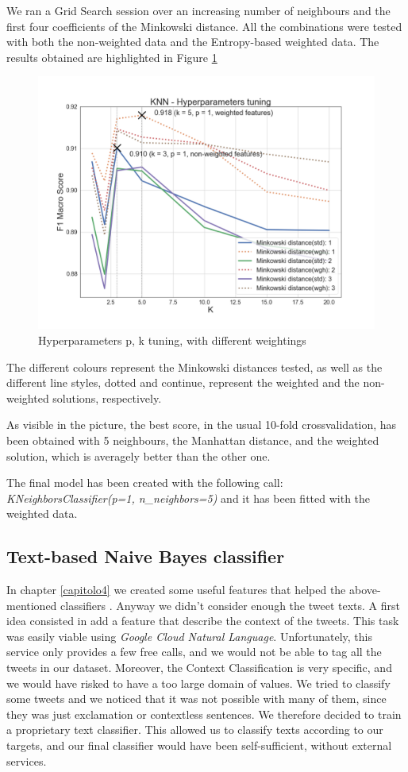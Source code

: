We ran a Grid Search session over an increasing number of neighbours and the first four coefficients of the Minkowski distance.
All the combinations were tested with both the non-weighted data and the Entropy-based weighted data.
The results obtained are highlighted in Figure \ref{fig:knn_tuning}

\begin{figure}
	\includegraphics[width=\columnwidth]{chapter5/figure/knn_tuning.png}
	\caption{Hyperparameters p, k tuning, with different weightings}
	\label{fig:knn_tuning}
\end{figure}
The different colours represent the Minkowski distances tested, as well as the different line styles, dotted and continue, represent the weighted and the non-weighted solutions, respectively.

As visible in the picture, the best score, in the usual 10-fold crossvalidation, has been obtained with 5 neighbours, the Manhattan distance, and the weighted solution, which is averagely better than the other one.

The final model has been created with the following call: \textit{KNeighborsClassifier(p=1, n\_neighbors=5)} and it has been fitted with the weighted data.

\subsection{Text-based Naive Bayes classifier}
In chapter \ref{capitolo4} we created some useful features that helped the above-mentioned classifiers . Anyway we didn't consider enough the tweet texts. A first idea consisted in add a feature that describe the context of the tweets. This task was easily viable using \textit{Google Cloud Natural Language}. Unfortunately, this service only provides a few free calls, and we would not be able to tag all the tweets in our dataset. Moreover, the Context Classification is very specific, and we would have risked to have a too large domain of values. We tried to classify some tweets and we noticed that it was not possible with many of them, since they was just exclamation or contextless sentences. We therefore decided to train a proprietary text classifier. This allowed us to classify texts according to our targets, and our final classifier would have been self-sufficient, without external services.
